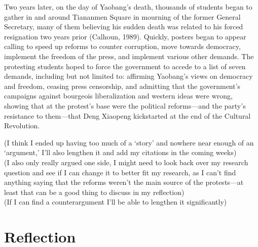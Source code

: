 \documentclass{paper}
\begin{document}
\begin{doublespace}
Two years later, on the day of Yaobang’s death, thousands of students began to gather in and around Tiananmen Square in mourning of the former General Secretary, many of them believing his sudden death was related to his forced resignation two years prior (Calhoun, 1989). Quickly, posters began to appear calling to speed up reforms to counter corruption, move towards democracy, implement the freedom of the press, and implement various other demands. The protesting students hoped to force the government to accede to a list of seven demands, including but not limited to: affirming Yaobang’s views on democracy and freedom, ceasing press censorship, and admitting that the government’s campaigns against bourgeois liberalization and western ideas were wrong, showing that at the protest’s base were the political reforms---and the party’s resistance to them---that Deng Xiaopeng kickstarted at the end of the Cultural Revolution.
\end{doublespace}

(I think I ended up having too much of a ‘story’ and nowhere near enough of an ‘argument,’ I’ll also lengthen it and add my citations in the coming weeks)\\
(I also only really argued one side, I might need to look back over my research question and see if I can change it to better fit my research, as I can’t find anything saying that the reforms weren’t the main source of the protests---at least that can be a good thing to discuss in my reflection)\\
(If I can find a counterargument I’ll be able to lengthen it significantly)\\
\newpage

\section{Reflection}
\begin{doublespace}
\end{doublespace}
\end{document}
